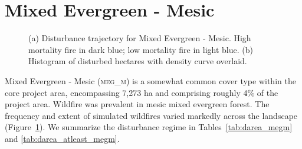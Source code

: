 \clearpage
\section{Mixed Evergreen - Mesic} 
\begin{figure}[!htbp]
  \centering
  \caption{(a) \small Disturbance trajectory for Mixed Evergreen - Mesic. High mortality fire in dark blue; low mortality fire in light blue. (b) Histogram of disturbed hectares with density curve overlaid.} 
  \label{fig:darea_megm}
\end{figure}

Mixed Evergreen - Mesic (\textsc{meg\_m}) is a somewhat common cover type within the core project area, encompassing 7,273 ha and comprising roughly 4\% of the project area. Wildfire was prevalent in mesic mixed evergreen forest. The frequency and extent of simulated wildfires  varied markedly across the landscape (Figure~\ref{fig:darea_megm}). We summarize the disturbance regime in Tables~\ref{tab:darea_megm} and \ref{tab:darea_atleast_megm}.



